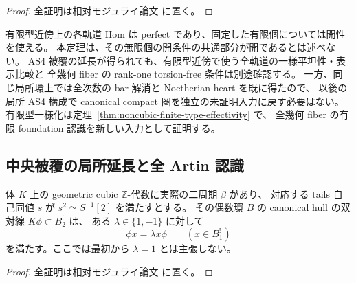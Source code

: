 \begin{proof}
全証明は相対モジュライ論文 \cite[\texttt{noncubic_local_tails}]{QuadricModuli2026} に置く。
\end{proof}

\begin{remark}[局所定理と有限型一様化の役割]
有限型近傍上の各軌道 Hom は perfect であり、固定した有限個については開性を使える。
本定理は、その無限個の開条件の共通部分が開であるとは述べない。
AS4 被覆の延長が得られても、有限型近傍で使う全軌道の一様平坦性・表示比較と
全幾何 fiber の rank-one torsion-free 条件は別途確認する。
一方、同じ局所環上では全次数の bar 解消と Noetherian heart を既に得たので、
以後の局所 AS4 構成で canonical compact 圏を独立の未証明入力に戻す必要はない。
有限型一様化は定理~\ref{thm:noncubic-finite-type-effectivity} で、
全幾何 fiber の有限 foundation 認識を新しい入力として証明する。
\end{remark}


\subsection{中央被覆の局所延長と全 Artin 認識}

\begin{lemma}
\label{lem:cubic-compatible-scalar-normalizer}
体 \(K\) 上の geometric cubic \(\mathbb Z\)-代数に実際の二周期 \(\beta\) があり、
対応する tails 自己同値 \(s\) が \(s^2\simeq S^{-1}[2]\) を満たすとする。
その偶数環 \(B\) の canonical hull の双対線 \(K\phi\subset B^!_2\) は、
ある \(\lambda\in\{1,-1\}\) に対して
\[
 \phi x=\lambda x\phi\qquad(x\in B^!_1)
\]
を満たす。ここでは最初から \(\lambda=1\) とは主張しない。
\end{lemma}
\begin{proof}
全証明は相対モジュライ論文 \cite[\texttt{noncubic_local_tails}]{QuadricModuli2026} に置く。
\end{proof}

